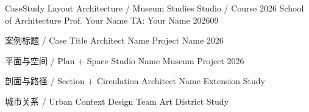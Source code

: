 \documentclass[aspectratio=169,10pt]{beamer}
\begin{document}
\CaseTitleSlide
  {CaseStudy Layout}
  {Architecture / Museum Studies}
  {Studio / Course 2026}
  {School of Architecture}
  {Prof. Your Name}
  {TA: Your Name}
  {202609}

\begin{caseframe}
  {案例标题 / Case Title}
  {Architect Name}
  { Project Name 2026}
\end{caseframe}

\begin{caseframe}
  {平面与空间 / Plan + Space}
  {Studio Name}
  { Museum Project 2026}
\end{caseframe}

\begin{caseframe}
  {剖面与路径 / Section + Circulation}
  {Architect Name}
  { Extension Study}
\end{caseframe}

\begin{caseframe}
  {城市关系 / Urban Context}
  {Design Team}
  { Art District Study}
\end{caseframe}
\end{document}
